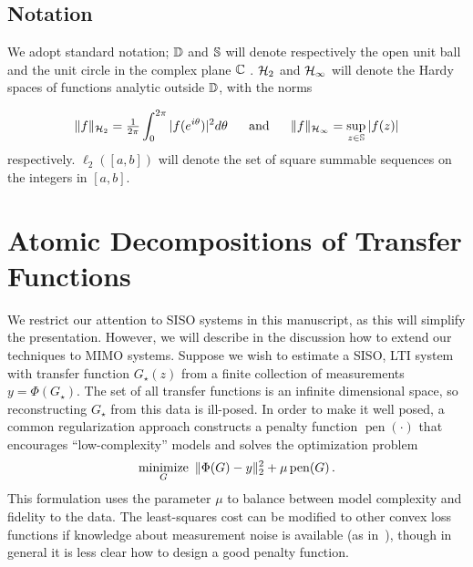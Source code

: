 \subsection{Notation}\label{sec:notation}

We adopt standard notation; $\mathbb{D}$ and $\mathbb{S}$ will denote respectively the open
unit ball and the unit circle in the complex plane $\mathbb{C}$ . $\mathcal{H}_2$ and
$\mathcal{H}_\infty$ will denote the Hardy spaces of functions analytic outside $\mathbb{D}$,
with the norms

\[\|f\|_{\mathcal{H}_2} = \tfrac{1}{2\pi} \int_0^{2\pi} |f(e^{i\theta})|^2 d\theta~~~~~\mbox{and}~~~~~\|f\|_{\mathcal{H}_\infty} = \sup_{z\in\mathbb{S}} |f(z)|\]
respectively.  $\ell_2([a,b])$ will denote the set of square summable sequences on the integers in $[a, b]$.

\section{Atomic Decompositions of Transfer Functions}\label{sec:atomic-def}
We restrict our attention to SISO systems in this manuscript, as this will simplify the presentation.  However, we will describe in the discussion how to extend our techniques to MIMO systems.  Suppose we wish to estimate a SISO, LTI system with transfer function $G_\star(z)$ from a finite collection of measurements $y=\Phi(G_\star)$.  The set of all transfer functions is an infinite dimensional space, so reconstructing $G_\star$ from this data is ill-posed.  In order to make it well posed, a common regularization approach constructs a penalty function $\operatorname{pen}(\cdot)$ that encourages ``low-complexity'' models and solves the optimization problem
\begin{equation}\label{eq:regularized}
	\mathop{\operatorname{minimize}}_G~\|\Phi(G)-y\|_2^2 + \mu \operatorname{pen}(G) \,.
\end{equation}
This formulation uses the parameter $\mu$ to balance between model complexity and fidelity to the data.  The least-squares cost can be modified to other convex loss functions if knowledge about measurement noise is available (as in~\cite{Smith12,Paganini96}), though in general it is less clear how to design a good penalty function.

